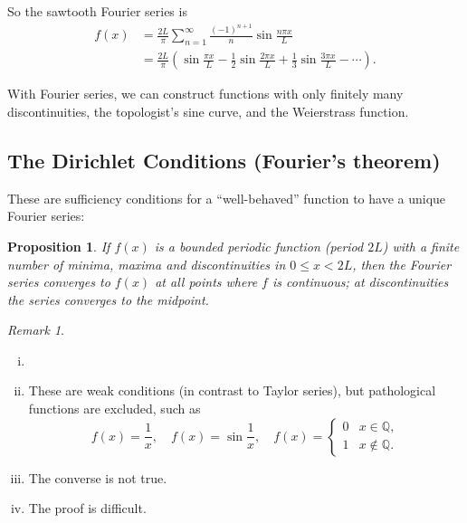\documentclass[12pt]{article}
\newtheorem{proposition}{Proposition}[section]
\theoremstyle{definition}
\theoremstyle{remark}
\newtheorem*{remark}{Remark}
\begin{document}
\begin{adjustbox}{minipage = \columnwidth - 25.5pt, margin=1em, frame=1pt, margin=0em}
	So the sawtooth Fourier series is
	\begin{align*}
		f(x) &= \frac{2L}{\pi} \sum_{n = 1}^{\infty} \frac{(-1)^{n+1}}{n} \sin \frac{n \pi x}{L} \\
		     &= \frac{2L}{\pi} \left( \sin \frac{\pi x}{L} - \frac{1}{2} \sin \frac{2 \pi x}{L} + \frac{1}{3} \sin \frac{3 \pi x}{L} - \cdots \right).
	\end{align*}

\end{adjustbox}

With Fourier series, we can construct functions with only finitely many discontinuities, the topologist's sine curve, and the Weierstrass function.

\subsection{The Dirichlet Conditions (Fourier's theorem)}%
\label{sub:the_dirichlet_conditions_fourier_s_theorem_}

These are sufficiency conditions for a ``well-behaved'' function to have a unique Fourier series:

\begin{proposition}
	If $f(x)$ is a bounded periodic function (period $2L$) with a finite number of minima, maxima and discontinuities in $0 \leq x < 2L$, then the Fourier series converges to  $f(x)$ at all points where $f$ is continuous; at discontinuities the series converges to the midpoint.
\end{proposition}

\begin{remark}
	\begin{enumerate}[(i)]
		\item[]
		\item These are weak conditions (in contrast to Taylor series), but pathological functions are excluded, such as
			\[
				f(x) = \frac{1}{x}, \quad f(x) = \sin \frac{1}{x}, \quad f(x) =
				\begin{cases}
					0 & x \in \mathbb{Q},\\
					1 & x \not \in \mathbb{Q}.
				\end{cases}
			\]
		\item The converse is not true.
		\item The proof is difficult.
	\end{enumerate}
	
\end{remark}
\end{document}
